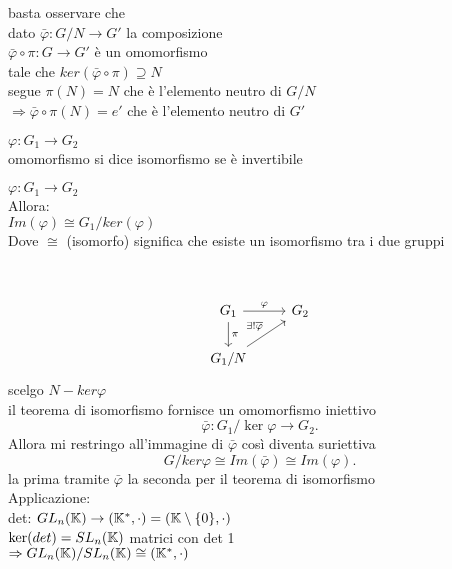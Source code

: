 \documentclass[12px]{article}
\begin{document}
	  \begin{dimo}
		  basta osservare che\\
		  dato $\bar \varphi: G/N \rightarrow G'$ la composizione\\
		  $\bar \varphi\circ \pi: G \rightarrow G'$ è un omomorfismo\\
		  tale che $ker(\bar \varphi\circ \pi)\supseteq N$\\
		  segue $\pi(N) = N$ che è l'elemento neutro di  $G/N$\\
		   $ \Rightarrow \bar \varphi\circ \pi (N) = e'$ che è l'elemento neutro  di $G'$\\
		   \end{dimo}
		   \newpage
		    \begin{defi}
		   	$ \varphi: G_1 \rightarrow G_2$\\
			omomorfismo si dice isomorfismo se è invertibile\\

		   \end{defi}
		   \begin{teo}
		   	$ \varphi:G_1 \rightarrow G_2$\\
			Allora:\\
			$Im( \varphi) \cong G_1/ker( \varphi)$\\
			Dove $\cong$ (isomorfo) significa che esiste un isomorfismo tra i due gruppi
		   \end{teo}\\
		   \begin{dimo}
		   \[
\begin{tikzcd}
G_1 \arrow[r, "\varphi"] \arrow[d, "\pi"] & G_2 \\
G_1 / N \arrow[ur, "\exists ! \overline{\varphi}"]
\end{tikzcd}
\]	
scelgo $N-ker \varphi$\\
il teorema di isomorfismo fornisce un omomorfismo iniettivo
\[
\bar\varphi: G_1/\ker \varphi \rightarrow G_2
.\] 
Allora mi restringo all'immagine di $\bar \varphi$ così diventa suriettiva\\
\[
G/ker \varphi \cong  Im ( \bar\varphi) \cong Im( \varphi)
.\] 
la prima tramite $\bar \varphi$ la seconda per il teorema di isomorfismo\\
Applicazione:\\
det: $GL_n(\mathbb{K}) \rightarrow (\mathbb{K}^*,\cdot) = (\mathbb{K}\setminus\{0\},\cdot)$ \\
$\ker(det) = SL_n(\mathbb{K})$ matrici con det 1\\
$ \Rightarrow GL_n(\mathbb{K})/SL_n(\mathbb{K}) \cong (\mathbb{K}^*,\cdot)$
		   \end{dimo}

	  	
\end{document}
